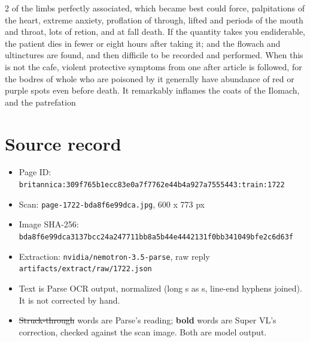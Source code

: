 \documentclass[10pt]{article}
\begin{document}
\begin{multicols}{2}
of the limbs perfectly associated, which became best could force, palpitations of the heart, extreme anxiety, proflation of through, lifted and periods of the mouth and throat, lots of retion, and at fall death. If the quantity takes you endiderable, the patient dies in fewer or eight hours after taking it; and the flowach and ultinctures are found, and then difficile to be recorded and performed. When this is not the cafe, violent protective symptoms from one after article is followed, for the bodres of whole who are poisoned by it generally have abundance of red or purple spots even before death. It remarkably inflames the coats of the Ilomach, and the patrefation
\end{multicols}
\section*{Source record}
\begin{itemize}
\item Page ID: \texttt{britannica:309f765b1ecc83e0a7f7762e44b4a927a7555443:train:1722}
\item Scan: \texttt{page-1722-bda8f6e99dca.jpg}, 600 x 773 px
\item Image SHA-256: \texttt{\small bda8f6e99dca3137bcc24a247711bb8a5b44e4442131f0bb341049bfe2c6d63f}
\item Extraction: \texttt{nvidia/nemotron-3.5-parse}, raw reply \texttt{artifacts/extract/raw/1722.json}
\item Text is Parse OCR output, normalized (long s as s, line-end hyphens joined). It is not corrected by hand.
\item \sout{Struck-through} words are Parse's reading; \textbf{bold} words are Super VL's correction, checked against the scan image. Both are model output.
\end{itemize}
\end{document}
